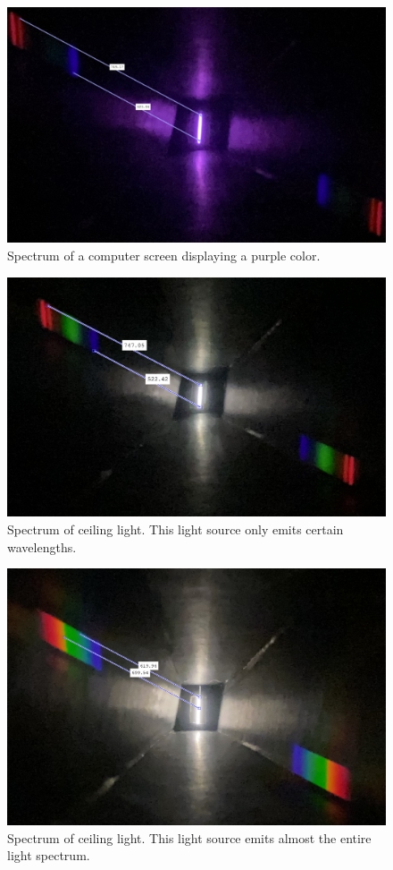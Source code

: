     \begin{figure}[H]
        \centering
        \includegraphics[scale = 0.3]{src/images/purple_screen.png}
        \caption{Spectrum of a computer screen displaying a purple color.}
        \label{fig_purple_screen}
    \end{figure}

    \begin{figure}[H]
        \centering
        \includegraphics[scale = 0.5]{src/images/lamp1.png}
        \caption{Spectrum of ceiling light. This light source only emits certain wavelengths.}
        \label{fig_lamp1}
    \end{figure}

    \begin{figure}[H]
        \centering
        \includegraphics[scale = 0.4]{src/images/lamp2.png}
        \caption{Spectrum of ceiling light. This light source emits almost the entire light spectrum.}
        \label{fig_lamp2}
    \end{figure}